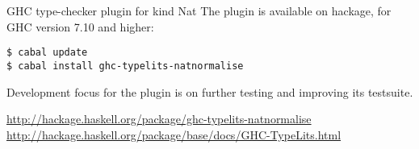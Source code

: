 \documentclass[DIV16,twocolumn,10pt]{scrreprt}
\begin{document}
\begin{hcarentry}{GHC type-checker plugin for kind Nat}
The plugin is available on hackage, for GHC version 7.10 and higher:
\begin{verbatim}
$ cabal update
$ cabal install ghc-typelits-natnormalise
\end{verbatim}

Development focus for the plugin is on further testing and improving its testsuite.

\FurtherReading
  \url{http://hackage.haskell.org/package/ghc-typelits-natnormalise} \\
  \url{http://hackage.haskell.org/package/base/docs/GHC-TypeLits.html}
\end{hcarentry}
\end{document}
